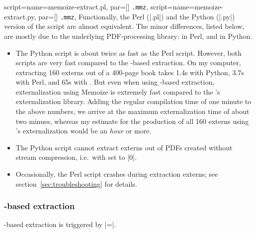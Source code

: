 \documentclass[a4paper,11pt]{article}
\begin{document}
\begin{doc}{
    script={name=memoize-extract.pl, par=[] \texttt{.mmz}},
    script={name=memoize-extract.py, par=[] \texttt{.mmz}},
  }
  Functionally, the Perl (|.pl|) and the Python (|.py|) version of the script
  are almost equivalent.  The minor differences, listed below, are mostly due
  to the underlying PDF-processing library:
   in Perl, and
   in Python.
  \begin{itemize}
  \item The Python script is about twice as fast as the Perl script.  However,
    both scripts are very fast compared to the -based extraction.
    On my computer, extracting 160 externs out of a 400-page book takes 1.4s
    with Python, 3.7s with Perl, and 65s with .  But even when
    using -based extraction, externalization using Memoize is
    extremely fast compared to the \TikZ's externalization library.  Adding
    the regular compilation time of one minute to the above numbers, we arrive
    at the maximum externalization time of about two minues, whereas my
    estimate for the production of all 160 externs using \TikZ's
    externalization would be an \emph{hour} or more.
  \item The Python script cannot extract externs out of PDFs created without
    stream compression, i.e.\ with 
     set to |0|.
  \item Occasionally, the Perl script crashes during extraction externs; see
    section~\ref{sec:troubleshooting} for details.
  \end{itemize}
\end{doc}

\subsubsection{\texorpdfstring{}{TeX}-based extraction}
\label{sec:ref:extraction-tex}

-based extraction is triggered by
|=|.
\end{document}
